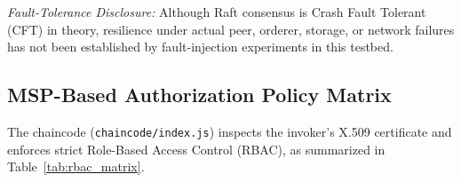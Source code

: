\documentclass[runningheads]{llncs}
\begin{document}
\noindent\textit{Fault-Tolerance Disclosure:} Although Raft consensus is Crash Fault Tolerant (CFT) in theory, resilience under actual peer, orderer, storage, or network failures has not been established by fault-injection experiments in this testbed.

\subsection{MSP-Based Authorization Policy Matrix}
The chaincode (\texttt{chaincode/index.js}) inspects the invoker's X.509 certificate and enforces strict Role-Based Access Control (RBAC), as summarized in Table~\ref{tab:rbac_matrix}.

\begin{table}[t]
\centering
\caption{MSP-based Role-Based Access Control (RBAC) smart contract authorization policy matrix.}\label{tab:rbac_matrix}
\end{table}

\end{document}
